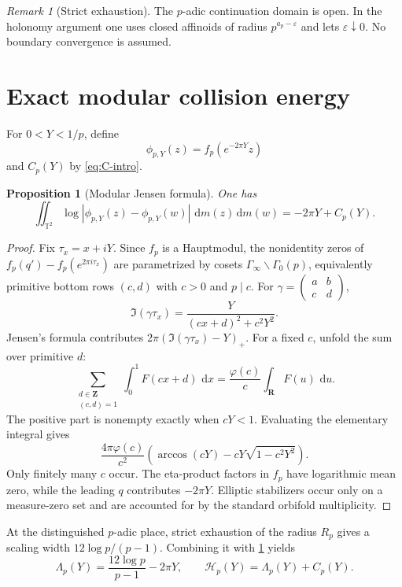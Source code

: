 \documentclass[11pt]{article}
\newtheorem{proposition}[proposition]{Proposition}
\theoremstyle{definition}
\theoremstyle{remark}
\newtheorem{remark}[remark]{Remark}
\newcommand{\Z}{\mathbf Z}
\newcommand{\R}{\mathbf R}
\newcommand{\dd}{\,\mathrm d}
\newcommand{\Energy}{\mathscr H}
\newcommand{\abs}[1]{\left|#1\right|}
\newcommand{\T}{\mathbb T}
\begin{document}
\begin{remark}[Strict exhaustion]
The $p$-adic continuation domain is open.  In the holonomy argument one uses
closed affinoids of radius $p^{a_p-\varepsilon}$ and lets
$\varepsilon\downarrow0$.  No boundary convergence is assumed.
\end{remark}

\section{Exact modular collision energy}\label{sec:collision}

For $0<Y<1/p$, define
\[
 \phi_{p,Y}(z)=f_p(e^{-2\pi Y}z)
\]
and $C_p(Y)$ by \eqref{eq:C-intro}.

\begin{proposition}[Modular Jensen formula]\label{prop:Jensen}
One has
\begin{equation}\label{eq:Jensen}
 \iint_{\T^2}
 \log\abs{\phi_{p,Y}(z)-\phi_{p,Y}(w)}\,\dd m(z)\dd m(w)
 =-2\pi Y+C_p(Y).
\end{equation}
\end{proposition}

\begin{proof}
Fix $\tau_x=x+iY$.  Since $f_p$ is a Hauptmodul, the nonidentity zeros of
$f_p(q')-f_p(e^{2\pi i\tau_x})$ are parametrized by cosets
$\Gamma_\infty\backslash\Gamma_0(p)$, equivalently primitive bottom rows
$(c,d)$ with $c>0$ and $p\mid c$.  For
$\gamma=\left(\begin{smallmatrix}a&b\\c&d\end{smallmatrix}\right)$,
\[
 \Im(\gamma\tau_x)=
 \frac{Y}{(cx+d)^2+c^2Y^2}.
\]
Jensen's formula contributes
$2\pi(\Im(\gamma\tau_x)-Y)_+$.  For a fixed $c$, unfold the sum over
primitive $d$:
\[
 \sum_{\substack{d\in\Z\\(c,d)=1}}
 \int_0^1F(cx+d)\,\dd x
 =\frac{\varphi(c)}{c}\int_\R F(u)\,\dd u.
\]
The positive part is nonempty exactly when $cY<1$.  Evaluating the elementary
integral gives
\[
 \frac{4\pi\varphi(c)}{c^2}
 \left(\arccos(cY)-cY\sqrt{1-c^2Y^2}\right).
\]
Only finitely many $c$ occur.  The eta-product factors in $f_p$ have
logarithmic mean zero, while the leading $q$ contributes $-2\pi Y$.
Elliptic stabilizers occur only on a measure-zero set and are accounted for by
the standard orbifold multiplicity.
\end{proof}

At the distinguished $p$-adic place, strict exhaustion of the radius $R_p$
gives a scaling width $12\log p/(p-1)$.  Combining it with
\cref{prop:Jensen} yields
\begin{equation}\label{eq:Lambda-energy}
 \Lambda_p(Y)=\frac{12\log p}{p-1}-2\pi Y,
 \qquad
 \Energy_p(Y)=\Lambda_p(Y)+C_p(Y).
\end{equation}
\end{document}
